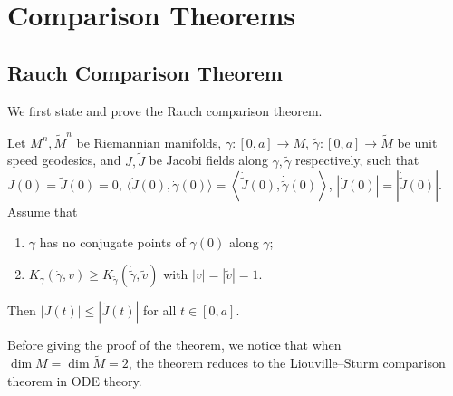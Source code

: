 \chapter{Comparison Theorems}

\section{Rauch Comparison Theorem}

We first state and prove the Rauch comparison theorem.

\begin{thm}\label{Rauch}
    Let $M^n,\tilde{M}^n$ be Riemannian manifolds, $\gamma:[0,a]\to M$, $\tilde{\gamma}:[0,a]\to\tilde{M}$ be unit speed geodesics, and $J,\tilde{J}$ be Jacobi fields along $\gamma,\tilde{\gamma}$ respectively, such that $J(0)=\tilde{J}(0)=0$, $\langle\dot{J}(0),\dot{\gamma}(0)\rangle=\left\langle\dot{\tilde{J}}(0),\dot{\tilde{\gamma}}(0)\right\rangle$, $|\dot{J}(0)|=\left|\dot{\tilde{J}}(0)\right|$.
    Assume that
    \begin{enumerate}[(1)]
        \item $\gamma$ has no conjugate points of $\gamma(0)$ along $\gamma$;
        \item $K_\gamma(\dot{\gamma},v)\geq K_{\tilde{\gamma}}\left(\dot{\tilde{\gamma}},\tilde{v}\right)$ with $|v|=|\tilde{v}|=1$.
    \end{enumerate}
    Then $|J(t)|\leq|\tilde{J}(t)|$ for all $t\in[0,a]$.
\end{thm}

\begin{rem}
    Before giving the proof of the theorem, we notice that when $\dim M=\dim\tilde{M}=2$, the theorem reduces to the Liouville--Sturm comparison theorem in ODE theory.
\end{rem}

